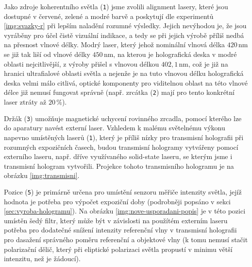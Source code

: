 \documentclass[twoside,project]{../MFFPrace}
\begin{document}
Jako zdroje koherentního světla (\texttt{1}) jsme zvolili alignment lasery, které jsou dostupné v červené, zelené a modré barvě a poskytují dle experimentů \ref{img:svazky-r} při lepším naladění rozumné výsledky. Jejich nevýhodou je, že jsou vyráběny pro účel čistě vizuální indikace, a tedy se při jejich výrobě příliš nedbá na přesnost vlnové délky. Modrý laser, který jehož nominální vlnová délka $420\,\text{nm}$ se již tak liší od vlnové délky $450\,\text{nm}$, na kterou je holografická deska v modré oblasti nejcitlivější, z výroby přišel s vlnovou délkou $402{,}1\,\text{nm}$, což je již na hranici ultrafialové oblasti světla a nejenže je na tuto vlnovou délku holografická deska velmi málo citlivá, optické komponenty pro viditelnou oblast na této vlnové délce již nemusí fungovat správně (např. zrcátka (\texttt{2}) mají pro tento konkrétní laser ztráty až $20\,\%$).

Držák (\texttt{3}) umožňuje magnetické uchycení rovinného zrcadla, pomocí kterého lze do aparatury navést externí laser. Vzhledem k malému světelnému výkonu napevno umístěných laserů (\texttt{1}), který je příliš nízky pro transmisní holografii při rozumných expozičních časech, budou transmisní hologramy vytvářeny pomocí externího laseru, např. dříve využívaného solid-state laseru, se kterým jsme i transmisní hologram vytvořili. Projekce tohoto transmisního hologramu je na obrázku \ref{img:transmisni}. %

Pozice (\texttt{5}) je primárně určena pro umístění senzoru měřiče intenzity světla, jejíž hodnota je potřeba pro výpočet expoziční doby (podrobněji popsáno v sekci \ref{sec:vyroba-hologramu}). Na obrázku \ref{img:nove-usporadani-popis} je v této pozici umístěn šedý filtr, který může být v závislosti na použítém externím laseru potřeba pro dodatečné snížení intenzity referenční vlny v transmisní holografii pro dasažení správného poměru referenční a objektové vlny (k tomu nemusí stačit polarizační dělič, který při eliptické polarizaci světla propustí v minimu větší intenzitu, než je žádoucí).
\end{document}
